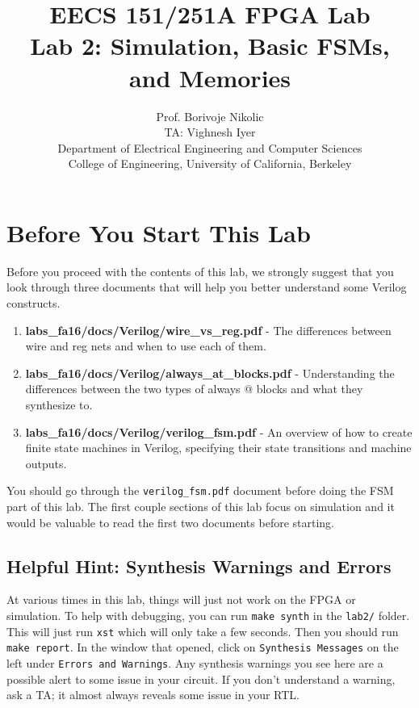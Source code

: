 \documentclass[11pt]{article}
\begin{document}
\title{EECS 151/251A FPGA Lab\\
Lab 2: Simulation, Basic FSMs, and Memories}

\author{Prof. Borivoje Nikolic \\
TA: Vighnesh Iyer \\Department of Electrical Engineering and Computer Sciences\\
College of Engineering, University of California, Berkeley}
\date{}
\maketitle

\section{Before You Start This Lab}

Before you proceed with the contents of this lab, we strongly suggest that you look through three documents that will help you better understand some Verilog constructs.

\begin{enumerate}
	\item \textbf{labs\_fa16/docs/Verilog/wire\_vs\_reg.pdf} - The differences between wire and reg nets and when to use each of them.
	
	\item \textbf{labs\_fa16/docs/Verilog/always\_at\_blocks.pdf} - Understanding the differences between the two types of always @ blocks and what they synthesize to.
	
	\item \textbf{labs\_fa16/docs/Verilog/verilog\_fsm.pdf} - An overview of how to create finite state machines in Verilog, specifying their state transitions and machine outputs.

\end{enumerate}

You should go through the \verb|verilog_fsm.pdf| document before doing the FSM part of this lab. The first couple sections of this lab focus on simulation and it would be valuable to read the first two documents before starting.

\subsection{Helpful Hint: Synthesis Warnings and Errors}
At various times in this lab, things will just not work on the FPGA or simulation. To help with debugging, you can run \verb|make synth| in the \verb|lab2/| folder. This will just run \verb|xst| which will only take a few seconds. Then you should run \verb|make report|. In the window that opened, click on \verb|Synthesis Messages| on the left under \verb|Errors and Warnings|. Any synthesis warnings you see here are a possible alert to some issue in your circuit. If you don't understand a warning, ask a TA; it almost always reveals some issue in your RTL.
\end{document}
